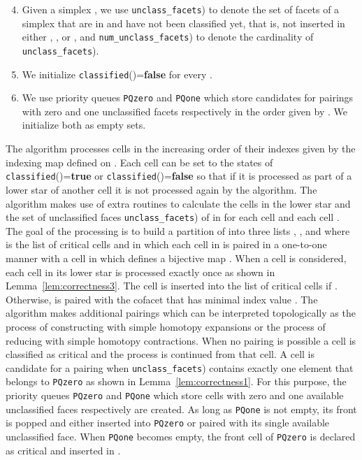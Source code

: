 \documentclass[12pt]{article}
\begin{document}
\begin{enumerate}\setcounter{enumi}{3}
\item Given a simplex , we use \texttt{{unclass}\_{facets}})
to denote the set of facets of a simplex  that are
in  and have not been classified yet, that is, not inserted
in either , , or , and \texttt{{num}\_{unclass}\_{facets}}) to denote the cardinality of
\texttt{{unclass}\_{facets}}).

\item We initialize \texttt{classified}()={\bf false}
for every .

\item We use priority queues \texttt{PQzero} and \texttt{PQone}
which store candidates for pairings with zero and one unclassified
facets respectively in the order given by . We initialize both as empty sets.
\end{enumerate}

The algorithm processes cells in the increasing order of their indexes given by the indexing map  defined on . Each cell  can be set to the states
of \texttt{classified}()={\bf true} or \texttt{classified}()={\bf false} so that if it is processed as part of a lower star of another cell it is not
processed again by the algorithm. The algorithm makes use of extra routines to calculate the cells in the lower star  and the set of unclassified
faces \texttt{{unclass}\_{facets}}) of  in  for each cell  and each cell .
The goal of the processing is to build a partition of  into three lists , , and  where  is the list
of critical cells and in which each cell in  is paired in a one-to-one manner with a cell in  which defines a bijective map .
When a cell  is considered, each cell in its lower star  is processed exactly once as shown in Lemma~\ref{lem:correctness3}. The cell  is inserted into the list of critical cells  if . Otherwise,
 is paired with the cofacet  that has minimal index value . The algorithm makes additional pairings which can be
interpreted topologically as the process of
constructing  with simple homotopy expansions or the process of reducing  with simple homotopy contractions.
When no pairing is possible a  cell is classified as critical and the
process is continued from that cell. A cell  is candidate for a pairing when \texttt{{unclass}\_{facets}}) contains exactly one element  that belongs to \texttt{PQzero} as shown in Lemma~\ref{lem:correctness1}. For this purpose, the priority queues \texttt{PQzero} and \texttt{PQone} which store cells with zero and
one available unclassified faces respectively are created. As long as \texttt{PQone} is not empty, its front is popped and either inserted into \texttt{PQzero} or paired with its single available unclassified face. When \texttt{PQone} becomes empty, the front cell of \texttt{PQzero} is declared as critical and inserted in .
\end{document}
